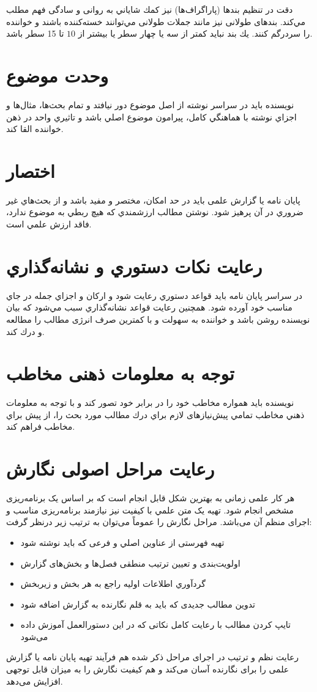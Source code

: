 دقت در تنظیم بندها (پاراگراف‌ها) نيز كمك شاياني به روانی و سادگی فهم مطلب مي‌كند‌.‌ بندهای طولانی نيز مانند جملات طولانی مي‌توانند خسته‌كننده باشند و خواننده را سردرگم كنند‌.‌ يك بند نبايد کمتر از سه یا چهار سطر یا بيشتر از $10$ تا 15 سطر باشد.‌ 

\section{وحدت موضوع}

نویسنده بايد در سراسر نوشته از اصل موضوع دور نيافتد و تمام بحث‌ها، مثال‌ها و اجزاي نوشته با هماهنگي كامل، پيرامون موضوع اصلي باشد و تاثيري واحد در ذهن خواننده القا كند. 
\section{اختصار}

پایان نامه یا گزارش علمی بايد در حد امكان، مختصر و مفيد باشد و از بحث‌هاي غير ضروري در آن پرهيز شود. نوشتن مطالب ارزشمندي كه هيچ ربطي به موضوع ندارد، فاقد ارزش علمي است.
\section{رعایت نكات دستوري و نشانه‌گذاري}
در سراسر پایان نامه بايد قواعد دستوري رعايت شود و اركان و اجزاي جمله در جاي مناسب خود آورده شود. همچنین رعايت قواعد نشانه‌گذاري سبب مي‌شود كه بيان نويسنده روشن باشد و خواننده به سهولت و با کمترین صرف انرژی مطالب را مطالعه و درك كند.
\section{توجه به معلومات ذهنی مخاطب}
نويسنده بايد همواره مخاطب خود را در برابر خود تصور كند و با توجه به معلومات ذهني مخاطب  تمامي پیش‌نیازهای لازم براي درك مطالب مورد بحث را، از پیش براي مخاطب فراهم كند.

\section{رعایت مراحل اصولی نگارش}
هر کار علمی زمانی به بهترین شکل قابل انجام است که بر اساس یک برنامه‌ریزی مشخص انجام شود. تهیه یک متن علمي با کیفیت نیز نیازمند برنامه‌ریزی مناسب و اجرای منظم آن می‌باشد. مراحل نگارش را عموماً می‌توان به ترتیب زیر درنظر گرفت:
\begin{itemize}


\item	تهيه فهرستی از عناوین اصلي و فرعی که باید نوشته شود
\item 	اولویت‌بندی و تعیین ترتیب منطقی فصل‌ها و بخش‌های گزارش
\item 	گردآوري اطلاعات اولیه راجع به هر بخش و زیربخش
\item 	تدوین مطالب جدیدی که باید به قلم نگارنده به گزارش اضافه شود
\item 	تایپ كردن مطالب با رعایت کامل نکاتی که در این دستورالعمل آموزش داده می‌شود
\end{itemize}
رعایت نظم و ترتیب در اجرای مراحل ذکر شده هم فرآیند تهیه پایان نامه یا گزارش علمی را برای نگارنده آسان می‌کند و هم کیفیت نگارش را به میزان قابل توجهی افزایش می‌دهد.